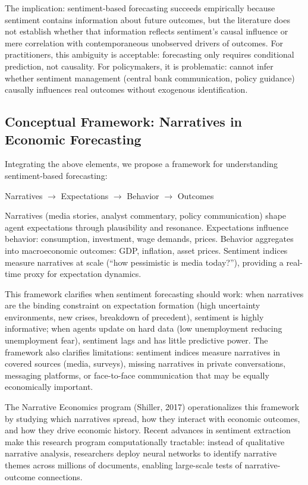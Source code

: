 \documentclass[11pt,twocolumn]{article}
\begin{document}
The implication: sentiment-based forecasting succeeds empirically because sentiment contains information about future outcomes, but the literature does not establish whether that information reflects sentiment's causal influence or mere correlation with contemporaneous unobserved drivers of outcomes. For practitioners, this ambiguity is acceptable: forecasting only requires conditional prediction, not causality. For policymakers, it is problematic: cannot infer whether sentiment management (central bank communication, policy guidance) causally influences real outcomes without exogenous identification.

\subsection{Conceptual Framework: Narratives in Economic Forecasting}

Integrating the above elements, we propose a framework for understanding sentiment-based forecasting:

\noindent
Narratives $\rightarrow$ Expectations $\rightarrow$ Behavior $\rightarrow$ Outcomes

Narratives (media stories, analyst commentary, policy communication) shape agent expectations through plausibility and resonance. Expectations influence behavior: consumption, investment, wage demands, prices. Behavior aggregates into macroeconomic outcomes: GDP, inflation, asset prices. Sentiment indices measure narratives at scale (``how pessimistic is media today?''), providing a real-time proxy for expectation dynamics.

This framework clarifies when sentiment forecasting should work: when narratives are the binding constraint on expectation formation (high uncertainty environments, new crises, breakdown of precedent), sentiment is highly informative; when agents update on hard data (low unemployment reducing unemployment fear), sentiment lags and has little predictive power. The framework also clarifies limitations: sentiment indices measure narratives in covered sources (media, surveys), missing narratives in private conversations, messaging platforms, or face-to-face communication that may be equally economically important.

The Narrative Economics program (Shiller, 2017) operationalizes this framework by studying which narratives spread, how they interact with economic outcomes, and how they drive economic history. Recent advances in sentiment extraction make this research program computationally tractable: instead of qualitative narrative analysis, researchers deploy neural networks to identify narrative themes across millions of documents, enabling large-scale tests of narrative-outcome connections.
\end{document}

